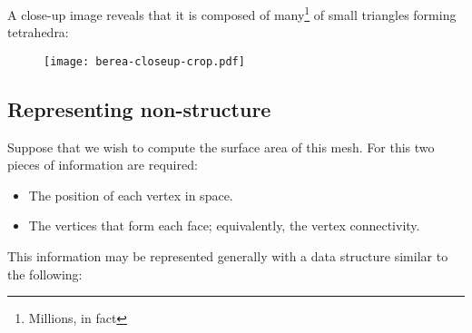 A close-up image reveals that it is composed of many\footnote{Millions, in fact} of small triangles forming tetrahedra:

\begin{figure}[H]
\centering
\texttt{[image: berea-closeup-crop.pdf]}
\end{figure}

\pagebreak
\subsection{Representing non-structure}
Suppose that we wish to compute the surface area of this mesh. For this two pieces of information are required:
\begin{itemize}
\item The position of each vertex in space.
\item The vertices that form each face; equivalently, the vertex connectivity.
\end{itemize}

This information may be represented generally with a data structure similar to the following:
%

